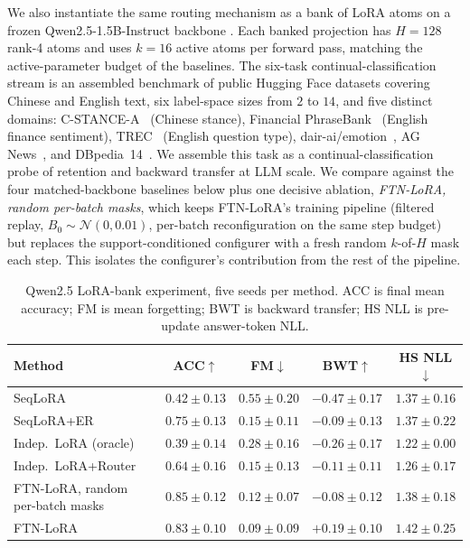 \documentclass{article}
\begin{document}
We also instantiate the same routing mechanism as a bank of LoRA atoms \citep{hu2022lora} on a frozen Qwen2.5-1.5B-Instruct backbone \citep{qwen2_5_2024}. Each banked projection has $H=128$ rank-4 atoms and uses $k=16$ active atoms per forward pass, matching the active-parameter budget of the baselines. The six-task continual-classification stream is an assembled benchmark of public Hugging Face datasets covering Chinese and English text, six label-space sizes from $2$ to $14$, and five distinct domains: C-STANCE-A~\citep{zhao2024cstance} (Chinese stance), Financial PhraseBank~\citep{malo2014finphrasebank} (English finance sentiment), TREC~\citep{li2002trec} (English question type), dair-ai/emotion~\citep{saravia2018emotion}, AG News~\citep{zhang2015charcnn}, and DBpedia~14~\citep{zhang2015charcnn}. We assemble this task as a continual-classification probe of retention and backward transfer at LLM scale. We compare against the four matched-backbone baselines below plus one decisive ablation, \emph{FTN-LoRA, random per-batch masks}, which keeps FTN-LoRA's training pipeline (filtered replay, $B_0\sim\mathcal{N}(0,0.01)$, per-batch reconfiguration on the same step budget) but replaces the support-conditioned configurer with a fresh random $k$-of-$H$ mask each step. This isolates the configurer's contribution from the rest of the pipeline.

\begin{table}[t]
\centering
\small
\setlength{\tabcolsep}{5pt}
\caption{Qwen2.5 LoRA-bank experiment, five seeds per method. ACC is final mean accuracy; FM is mean forgetting; BWT is backward transfer; HS NLL is pre-update answer-token NLL.}
\begin{tabular}{lcccc}
\toprule
Method & ACC$\uparrow$ & FM$\downarrow$ & BWT$\uparrow$ & HS NLL$\downarrow$ \\
\midrule
SeqLoRA & $0.42\pm0.13$ & $0.55\pm0.20$ & $-0.47\pm0.17$ & $1.37\pm0.16$ \\
SeqLoRA+ER & $0.75\pm0.13$ & $0.15\pm0.11$ & $-0.09\pm0.13$ & $1.37\pm0.22$ \\
Indep.\ LoRA (oracle) & $0.39\pm0.14$ & $0.28\pm0.16$ & $-0.26\pm0.17$ & $1.22\pm0.00$ \\
Indep.\ LoRA+Router & $0.64\pm0.16$ & $0.15\pm0.13$ & $-0.11\pm0.11$ & $1.26\pm0.17$ \\
FTN-LoRA, random per-batch masks & $\mathbf{0.85\pm0.12}$ & $\mathbf{0.12\pm0.07}$ & $-0.08\pm0.12$ & $1.38\pm0.18$ \\
FTN-LoRA & $0.83\pm0.10$ & $0.09\pm0.09$ & $\mathbf{+0.19\pm0.10}$ & $1.42\pm0.25$ \\
\bottomrule
\end{tabular}
\label{tab:lora_main}
\end{table}
\end{document}

